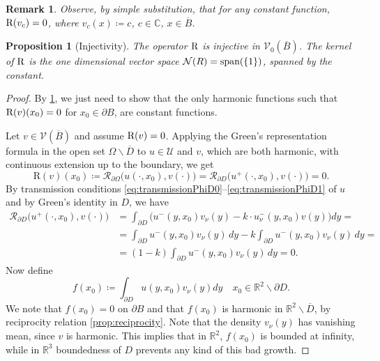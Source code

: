 \documentclass[10pt, a4paper, twoside, openright]{book}
\theoremstyle{definition}
\theoremstyle{plain}
\theoremstyle{plain}
\theoremstyle{plain}
\newtheorem{proposition}[subsection]{Proposition}
\theoremstyle{plain}
\newtheorem{remark}[subsection]{Remark}
\theoremstyle{plain}
\theoremstyle{plain}
\theoremstyle{plain}
\theoremstyle{plain}
\begin{document}
\begin{remark}
 \label{rem:kernel-R}
 Observe, by simple substitution, that for any constant function, $\textup{R}(v_c)=0$, where $v_c(x)\coloneqq c$, $c\in\mathbb{C}$, $x\in\overline{B}$.
\end{remark}
\begin{proposition}[Injectivity]
\label{prop:injectivity}
 The operator $\textup{R}$ is injective in $\mathcal{V}_0(\overline{B})$. The kernel of $\textup{R}$ is the one dimensional vector space $\mathcal{N}(R)=\textup{span}(\{1\})$, spanned by the constant.
\end{proposition}
\begin{proof}
\label{proof:injectivity}
By \ref{rem:kernel-R}, we just need to show that the only harmonic functions such that $\textup{R}(v)(x_0)=0$ for $x_0\in\partial B$, are constant functions.
\par
Let $v\in\mathcal{V}(\overline{B})$ and assume $\textup{R}(v)=0$. Applying the Green's representation formula in the open set $\Omega\backslash\overline{D}$ to $u\in\mathcal{U}$ and $v$, 
which are both harmonic, with continuous extension up to the boundary, we get
\begin{equation}
  \text{R}(v)(x_0)\coloneqq\mathcal{R}_{\partial\Omega}\bigl(u(\cdot,x_0),v(\cdot)\bigr) = \mathcal{R}_{\partial D}\bigl(u^+(\cdot,x_0),v(\cdot)\bigr) = 0.
 \end{equation}
 By transmission conditions \eqref{eq:transmissionPhiD0}--\eqref{eq:transmissionPhiD1} of $u$ and by Green's identity in $D$, we have
 \begin{align*}
  \mathcal{R}_{\partial D}\bigl(u^+(\cdot,x_0),v(\cdot)\bigr) &= \int_{\partial D}\bigl(u^-(y,x_0)v_\nu (y) - k \cdot u^-_\nu(y,x_0)v(y)\bigr)dy = \\
  &= \int_{\partial D}u^-(y,x_0)v_\nu (y)\,dy - k\int_{\partial D}u^-(y,x_0)v_\nu (y)\,dy = \\
  &= (1-k)\int_{\partial D}u^-(y,x_0)v_\nu (y)\,dy = 0.
 \end{align*}
 Now define
 \begin{equation}
  f(x_0)\coloneqq \int_{\partial D} u(y,x_0)v_\nu(y)dy\quad x_0 \in \mathbb{R}^2\backslash\partial D.
 \end{equation}
 We note that $f(x_0)=0$ on $\partial B$ and 
 that $f(x_0)$ is harmonic in $\mathbb{R}^2\backslash\overline{D}$, by reciprocity relation \ref{prop:reciprocity}.
 Note that the density $v_\nu(y)$ has vanishing mean, since $v$ is harmonic. This implies that in $\mathbb{R}^2$, $f(x_0)$ is bounded at infinity, while in $\mathbb{R}^3$ boundedness of $D$ prevents any kind of this bad growth.

\end{proof}
\end{document}
